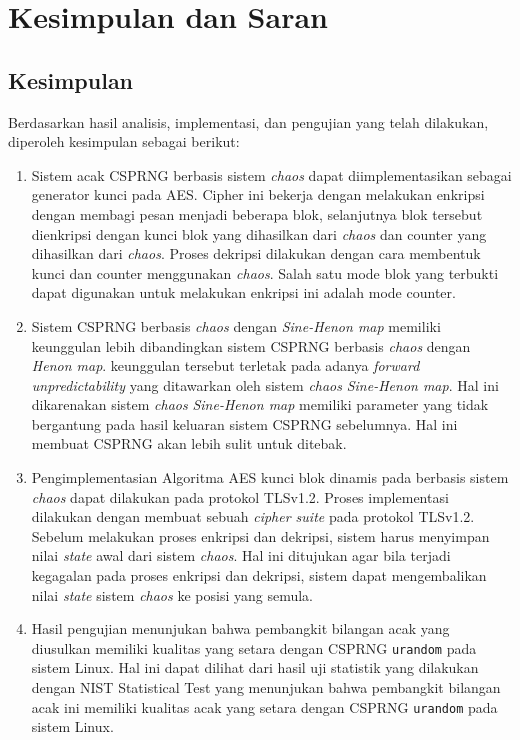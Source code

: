 \chapter{Kesimpulan dan Saran}

\section{Kesimpulan}
Berdasarkan hasil analisis, implementasi, dan pengujian yang telah dilakukan, diperoleh kesimpulan sebagai berikut:
\begin{enumerate}
  \item Sistem acak CSPRNG berbasis sistem \emph{chaos} dapat diimplementasikan sebagai generator kunci pada AES. Cipher ini bekerja dengan melakukan enkripsi dengan membagi pesan menjadi beberapa blok, selanjutnya blok tersebut dienkripsi dengan kunci blok yang dihasilkan dari \emph{chaos} dan counter yang dihasilkan dari \emph{chaos}. Proses dekripsi dilakukan dengan cara membentuk kunci dan counter menggunakan \emph{chaos}. Salah satu mode blok yang terbukti dapat digunakan untuk melakukan enkripsi ini adalah mode counter.
  \item Sistem CSPRNG berbasis \emph{chaos} dengan \emph{Sine-Henon map} memiliki keunggulan lebih dibandingkan sistem CSPRNG berbasis \emph{chaos} dengan \emph{Henon map}. keunggulan tersebut terletak pada adanya \emph{forward unpredictability} yang ditawarkan oleh sistem \emph{chaos} \emph{Sine-Henon map}. Hal ini dikarenakan sistem \emph{chaos} \emph{Sine-Henon map} memiliki parameter yang tidak bergantung pada hasil keluaran sistem CSPRNG sebelumnya. Hal ini membuat CSPRNG akan lebih sulit untuk ditebak.
  \item Pengimplementasian Algoritma AES kunci blok dinamis pada berbasis sistem \emph{chaos} dapat dilakukan pada protokol TLSv1.2. Proses implementasi dilakukan dengan membuat sebuah \emph{cipher suite} pada protokol TLSv1.2. Sebelum melakukan proses enkripsi dan dekripsi, sistem harus menyimpan nilai \emph{state} awal dari sistem \emph{chaos}. Hal ini ditujukan agar bila terjadi kegagalan pada proses enkripsi dan dekripsi, sistem dapat mengembalikan nilai \emph{state} sistem \emph{chaos} ke posisi yang semula.
  \item Hasil pengujian menunjukan bahwa pembangkit bilangan acak yang diusulkan memiliki kualitas yang setara dengan CSPRNG \texttt{urandom} pada sistem Linux. Hal ini dapat dilihat dari hasil uji statistik yang dilakukan dengan NIST Statistical Test yang menunjukan bahwa pembangkit bilangan acak ini memiliki kualitas acak yang setara dengan CSPRNG \texttt{urandom} pada sistem Linux.

\end{enumerate}

